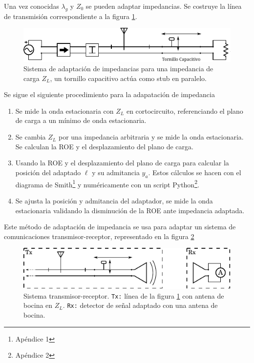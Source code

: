 \documentclass[11pt,a4paper]{article}
\begin{document}
\begin{multicols}{2}
Una vez conocidas $\lambda_g$ y $Z_0$ se pueden adaptar impedancias. Se costruye la línea de transmisión correspondiente a la figura \ref{fig:arr4}.

\begin{figure}[H]
    \centering
    \includegraphics[width=\linewidth]{Images/arreglo4.pdf}
    \caption{Sistema de adaptación de impedancias para una impedancia de carga $Z_L$, un tornillo capacitivo actúa como stub en paralelo.}
    \label{fig:arr4}
\end{figure}

Se sigue el siguiente procedimiento para la adapatación de impedancia

\begin{enumerate}
    \item Se mide la onda estacionaria con $Z_L$ en cortocircuito, referenciando el plano de carga a un mínimo de onda estacionaria.
    \item Se cambia $Z_L$ por una impedancia arbitraria y se mide la onda estacionaria. Se calculan la ROE y el desplazamiento del plano de carga.
    \item Usando la ROE y el desplazamiento del plano de carga para calcular la posición del adaptado $\ell$ y su admitancia $y_a$. 
    Estos cálculos se hacen con el diagrama de Smith\footnote{Apéndice 1} y numéricamente con un script Python\footnote{Apéndice 2}.
    \item Se ajusta la posición y admitancia del adaptador, se mide la onda estacionaria validando la disminución de la ROE ante impedancia adaptada.
\end{enumerate}

Este método de adaptación de impedancia se usa para adaptar un sistema de comunicaciones transmisor-receptor, representado en la figura \ref{fig:sistema}

\begin{figure}[H]
    \centering
    \includegraphics[width=\linewidth]{Images/sistema.pdf}
    \caption{Sistema transmisor-receptor.
    \texttt{Tx:} línea de la figura \ref{fig:arr4} con antena de bocina en $Z_L$. 
    \texttt{Rx:} detector de señal adaptado con una antena de bocina.}
    \label{fig:sistema}
\end{figure}


\end{multicols}
\end{document}
